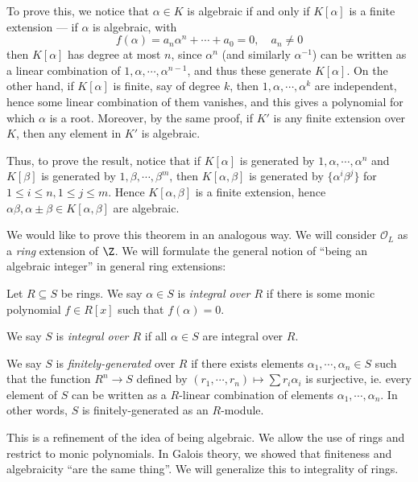 \documentclass[a4paper]{article}
\begin{document}
To prove this, we notice that $\alpha \in K$ is algebraic if and only if $K[\alpha]$ is a finite extension --- if $\alpha$ is algebraic, with
\[
  f(\alpha) = a_n \alpha^n + \cdots + a_0 = 0,\quad a_n \not= 0
\]
then $K[\alpha]$ has degree at most $n$, since $\alpha^n$ (and similarly $\alpha^{-1}$) can be written as a linear combination of $1, \alpha, \cdots, \alpha^{n - 1}$, and thus these generate $K[\alpha]$. On the other hand, if $K[\alpha]$ is finite, say of degree $k$, then $1, \alpha, \cdots, \alpha^k$ are independent, hence some linear combination of them vanishes, and this gives a polynomial for which $\alpha$ is a root. Moreover, by the same proof, if $K'$ is any finite extension over $K$, then any element in $K'$ is algebraic.

Thus, to prove the result, notice that if $K[\alpha]$ is generated by $1, \alpha, \cdots, \alpha^n$ and $K[\beta]$ is generated by $1, \beta, \cdots, \beta^m$, then $K[\alpha, \beta]$ is generated by $\{\alpha^i \beta^j\}$ for $1 \leq i \leq n, 1 \leq j \leq m$. Hence $K[\alpha, \beta]$ is a finite extension, hence $\alpha\beta, \alpha \pm \beta \in K[\alpha, \beta]$ are algebraic.

We would like to prove this theorem in an analogous way. We will consider $\mathcal{O}_L$ as a \emph{ring} extension of $\Z$. We will formulate the general notion of ``being an algebraic integer'' in general ring extensions:

\begin{defi}[Integrality]
  Let $R \subseteq S$ be rings. We say $\alpha \in S$ is \emph{integral over $R$} if there is some monic polynomial $f \in R[x]$ such that $f(\alpha) = 0$.

  We say $S$ is \emph{integral over $R$} if all $\alpha \in S$ are integral over $R$.
\end{defi}

\begin{defi}
  We say $S$ is \emph{finitely-generated} over $R$ if there exists elements $\alpha_1, \cdots, \alpha_n \in S$ such that the function $R^n \to S$ defined by $(r_1, \cdots, r_n) \mapsto \sum r_i \alpha_i$ is surjective, ie. every element of $S$ can be written as a $R$-linear combination of elements $\alpha_1, \cdots, \alpha_n$. In other words, $S$ is finitely-generated as an $R$-module.
\end{defi}
This is a refinement of the idea of being algebraic. We allow the use of rings and restrict to monic polynomials. In Galois theory, we showed that finiteness and algebraicity ``are the same thing''. We will generalize this to integrality of rings.
\end{document}
